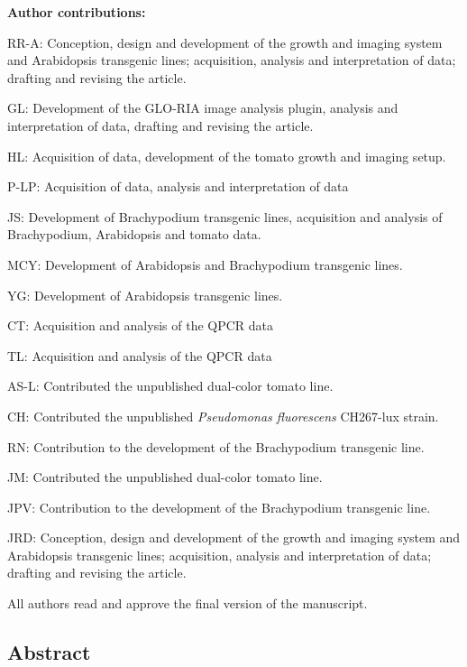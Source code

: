 \documentclass[]{article}
\begin{document}
\textbf{Author contributions:}

RR-A: Conception, design and development of the growth and imaging
system and Arabidopsis transgenic lines; acquisition, analysis and
interpretation of data; drafting and revising the article.

GL: Development of the GLO-RIA image analysis plugin, analysis and
interpretation of data, drafting and revising the article.

HL: Acquisition of data, development of the tomato growth and imaging
setup.

P-LP: Acquisition of data, analysis and interpretation of data

JS: Development of Brachypodium transgenic lines, acquisition and
analysis of Brachypodium, Arabidopsis and tomato data.

MCY: Development of Arabidopsis and Brachypodium transgenic lines.

YG: Development of Arabidopsis transgenic lines.

CT: Acquisition and analysis of the QPCR data

TL: Acquisition and analysis of the QPCR data

AS-L: Contributed the unpublished dual-color tomato line.

CH: Contributed the unpublished \emph{Pseudomonas fluorescens} CH267-lux
strain.

RN: Contribution to the development of the Brachypodium transgenic line.

JM: Contributed the unpublished dual-color tomato line.

JPV: Contribution to the development of the Brachypodium transgenic
line.

JRD: Conception, design and development of the growth and imaging system
and Arabidopsis transgenic lines; acquisition, analysis and
interpretation of data; drafting and revising the article.

All authors read and approve the final version of the manuscript.

\subsection{Abstract}\label{abstract}
\end{document}
